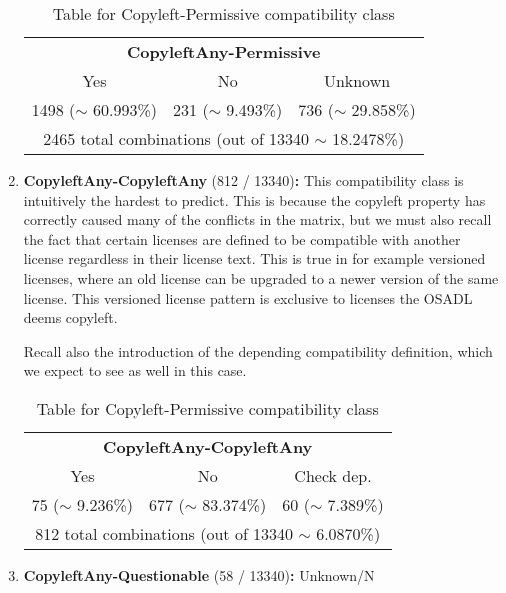 \begin{enumerate}
	\begin{table}[h]
		\caption{Table for Copyleft-Permissive compatibility class}
		\label{tab:copyleft-permissive-table}
		\centering
		\begin{tabular}{|c|c|c|}
			\hline
			\multicolumn{3}{|c|}{\textbf{CopyleftAny-Permissive}} \\
			Yes & No & Unknown \\
			1498 ($\sim$ 60.993\%) & 231 ($\sim$ 9.493\%) & 736 ($\sim$ 29.858\%) \\\hline
			\multicolumn{3}{|c|}{2465 total combinations (out of 13340 $\sim$ 18.2478\%)} \\
			\hline
		\end{tabular}
	\end{table}
	
	\item \textbf{CopyleftAny-CopyleftAny} (812 / 13340)\textbf{:} This compatibility class is intuitively the hardest to predict. This is because the copyleft property has correctly caused many of the conflicts in the matrix, but we must also recall the fact that certain licenses are defined to be compatible with another license regardless in their license text. This is true in for example versioned licenses, where an old license can be upgraded to a newer version of the same license. This versioned license pattern is exclusive to licenses the OSADL deems copyleft.
	
	Recall also the introduction of the depending compatibility definition, which we expect to see as well in this case.
	
	\begin{table}[h]
		\caption{Table for Copyleft-Permissive compatibility class}
		\label{tab:copyleft-copyleft-table}
		\centering
		\begin{tabular}{|c|c|c|}
			\hline
			\multicolumn{3}{|c|}{\textbf{CopyleftAny-CopyleftAny}} \\
			Yes & No & Check dep. \\
			75 ($\sim$ 9.236\%) & 677 ($\sim$ 83.374\%) & 60 ($\sim$ 7.389\%) \\\hline
			\multicolumn{3}{|c|}{812 total combinations (out of 13340 $\sim$ 6.0870\%)} \\
			\hline
		\end{tabular}
	\end{table}
	
	\item \textbf{CopyleftAny-Questionable} (58 / 13340)\textbf{:} Unknown/N
\end{enumerate}